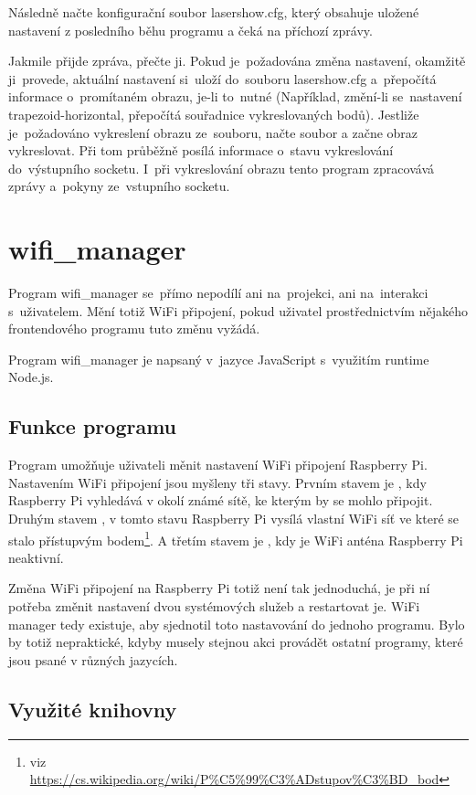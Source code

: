 Následně načte konfigurační soubor lasershow.cfg, který obsahuje uložené nastavení z posledního běhu programu a čeká na příchozí zprávy.

Jakmile přijde zpráva, přečte ji. Pokud je~požadována změna nastavení, okamžitě ji~provede, aktuální nastavení si~uloží do~souboru lasershow.cfg a~přepočítá informace o~promítaném obrazu, je-li to~nutné (Například, změní-li se~nastavení trapezoid-horizontal, přepočítá souřadnice vykreslovaných bodů).
Jestliže je~požadováno vykreslení obrazu ze~souboru, načte soubor a začne obraz vykreslovat.
Při tom průběžně posílá informace o~stavu vykreslování do~výstupního socketu.
I~při vykreslování obrazu tento program zpracovává zprávy a~pokyny ze~vstupního socketu.

\section{wifi\_manager}

Program wifi\_manager se~přímo nepodílí ani na~projekci, ani na~interakci s~uživatelem. Mění totiž WiFi připojení, pokud uživatel prostřednictvím nějakého frontendového programu tuto změnu vyžádá.

Program wifi\_manager je napsaný v~jazyce JavaScript s~využitím runtime Node.js.

\subsection{Funkce programu}
Program umožňuje uživateli měnit nastavení WiFi připojení Raspberry Pi. Nastavením WiFi připojení jsou myšleny tři stavy.
Prvním stavem je , kdy Raspberry Pi vyhledává v okolí známé sítě, ke kterým by se mohlo připojit.
Druhým stavem , v tomto stavu Raspberry Pi vysílá vlastní WiFi síť ve které se stalo přístupvým bodem\footnote{viz \url{https://cs.wikipedia.org/wiki/P\%C5\%99\%C3\%ADstupov\%C3\%BD\_bod}}.
A třetím stavem je , kdy je WiFi anténa Raspberry Pi neaktivní.

Změna WiFi připojení na Raspberry Pi totiž není tak jednoduchá, je při ní potřeba změnit nastavení dvou systémových služeb a restartovat je.
WiFi manager tedy existuje, aby sjednotil toto nastavování do jednoho programu. Bylo by totiž nepraktické, kdyby musely stejnou akci provádět ostatní programy, které jsou psané v různých jazycích.

\subsection{Využité knihovny}
